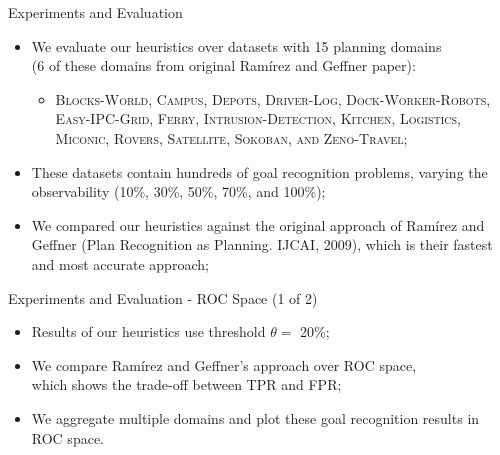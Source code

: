 \documentclass{beamer}
\begin{document}
    \begin{frame}{Experiments and Evaluation}
       	\begin{itemize}
       		\item We evaluate our heuristics over datasets with 15 planning domains \\(6 of these domains from original Ramírez and Geffner paper):
			\begin{itemize}
				\item {\footnotesize \textsc{Blocks-World, Campus, Depots, Driver-Log, Dock-Worker-Robots, Easy-IPC-Grid, Ferry, Intrusion-Detection, Kitchen, Logistics, Miconic, Rovers, Satellite, Sokoban, and Zeno-Travel}}; 
			\end{itemize}
			\item These datasets contain hundreds of goal recognition problems, varying the observability (10\%, 30\%, 50\%, 70\%, and 100\%);
			\item We compared our heuristics against the original approach of Ramírez and Geffner ({\footnotesize Plan Recognition as Planning. IJCAI, 2009}), which is their fastest and most accurate approach;
		\end{itemize}
    \end{frame}


    \begin{frame}{Experiments and Evaluation - ROC Space (1 of 2)}
       	\begin{itemize}
       		\item Results of our heuristics use threshold $\theta = $ 20\%;
			\item We compare Ramírez and Geffner's approach over ROC space,\\
			which shows the trade-off between TPR and FPR;
			\item We aggregate multiple domains and plot these goal recognition results in ROC space.
		\end{itemize}
	\end{frame}

\end{document}
